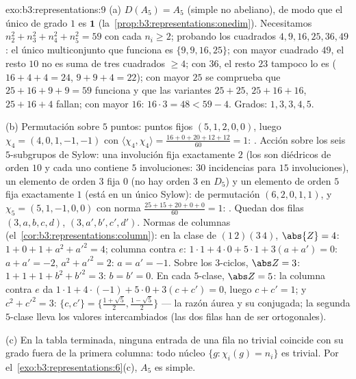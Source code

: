 \begin{solution}{exo:b3:representations:9}
(a) $D(A_5) = A_5$ (simple no abeliano), de modo que el único
 de grado $1$ es
$\mathbf 1$ (la~\cref{prop:b3:representations:onedim}). Necesitamos
$n_2^2 + n_3^2
+ n_4^2 + n_5^2 = 59$ con cada $n_i \geq 2$; probando los cuadrados
$4, 9, 16, 25, 36, 49$: el único multiconjunto que funciona es
$\{9, 9, 16, 25\}$; con mayor cuadrado $49$, el resto $10$ no es suma de
tres cuadrados $\geq 4$; con $36$, el resto $23$ tampoco lo es
($16 + 4 + 4 = 24$, $9 + 9 + 4 = 22$); con mayor $25$ se comprueba que
$25 + 16 + 9 + 9 = 59$ funciona y que las variantes $25 +
25$, $25 + 16 + 16$, $25 + 16 + 4$ fallan; con mayor $16$:
$16\cdot3 = 48 < 59 - 4$. Grados: $1, 3, 3, 4, 5$.

(b) Permutación sobre $5$ puntos: puntos fijos $(5, 1, 2, 0, 0)$, luego
$\chi_4 = (4, 0, 1, -1, -1)$ con
$\langle\chi_4,\chi_4\rangle = \frac{16 + 0 + 20 + 12 + 12}{60}
= 1$: . Acción sobre los
seis $5$-subgrupos de Sylow: una involución fija exactamente $2$ (los
 son diédricos de orden
$10$ y cada uno contiene $5$ involuciones: $30$ incidencias para $15$
involuciones), un elemento de orden $3$ fija $0$ (no hay orden $3$ en
$D_5$) y un elemento de orden $5$ fija exactamente $1$ (está en un único
Sylow):  de
permutación $(6, 2, 0, 1, 1)$, y $\chi_5 =
(5, 1, -1, 0, 0)$ con norma $\frac{25 + 15 + 20 + 0 + 0}{60} =
1$: . Quedan dos filas
$(3, a, b, c, d)$, $(3, a', b', c',
d')$. Normas de columnas (el~\cref{cor:b3:representations:column}): en
la clase de
$(1\,2)(3\,4)$, $\abs{Z} = 4$: $1 + 0 + 1 + a^2 + a'^2 = 4$;
columna contra $e$: $1\cdot1 + 4\cdot 0 + 5\cdot1 + 3(a + a') =
0$: $a + a' = -2$, $a^2 + a'^2 = 2$: $a = a' = -1$. Sobre los
$3$-ciclos, $\abs Z = 3$: $1 + 1 + 1 + b^2 + b'^2 = 3$: $b = b'
= 0$. En cada $5$-clase, $\abs Z = 5$: la columna contra $e$ da
$1\cdot 1 + 4\cdot(-1) + 5\cdot 0 + 3(c + c') = 0$, luego $c + c' = 1$;
y $c^2 + c'^2 = 3$: $\{c, c'\} = \bigl\{\frac{1+\sqrt5}2,
\frac{1-\sqrt5}2\bigr\}$ --- la razón áurea y su conjugada; la segunda
$5$-clase lleva los valores intercambiados (las dos filas han de ser
ortogonales).

(c) En la tabla terminada, ninguna entrada de una fila no trivial
coincide con su grado fuera de la primera columna: todo núcleo $\{g :
\chi_i(g) = n_i\}$ es trivial. Por
el~\cref{exo:b3:representations:6}(c), $A_5$ es simple.
\end{solution}

